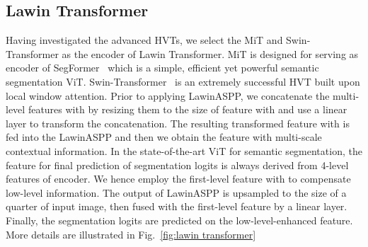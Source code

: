 \documentclass[10pt,twocolumn,letterpaper]{article}
\begin{document}
\subsection{Lawin Transformer}
Having investigated the advanced HVTs, we select the MiT and Swin-Transformer as the encoder of Lawin Transformer. MiT is designed for serving as encoder of SegFormer~\cite{xie2021segformer} which is a simple, efficient yet powerful semantic segmentation ViT. Swin-Transformer~\cite{liu2021swin} is an extremely successful HVT built upon local window attention. Prior to applying LawinASPP, we concatenate the multi-level features with   by resizing them to the size of feature with   and use a linear layer to transform the concatenation. The resulting transformed feature with   is fed into the LawinASPP and then we obtain the feature with multi-scale contextual information. In the state-of-the-art ViT for semantic segmentation, the feature for final prediction of segmentation logits is always derived from 4-level features of encoder. We hence employ the first-level feature with   to compensate low-level information. The output of LawinASPP is upsampled to the size of a quarter of input image, then fused with the first-level feature by a linear layer. Finally, the segmentation logits are predicted on the low-level-enhanced feature. More details are illustrated in Fig.~\ref{fig:lawin transformer} 
\end{document}
